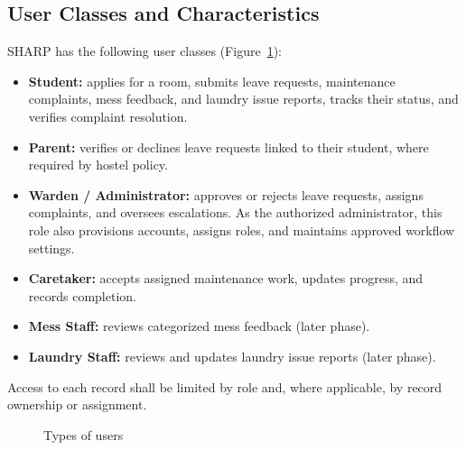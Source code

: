\documentclass[11pt,a4paper]{article}
\numberwithin{figure}{section}   %
\begin{document}
\subsection{User Classes and Characteristics}\label{sec:users}
SHARP has the following user classes (Figure~\ref{fig:users}):
\begin{itemize}
\item \textbf{Student:} applies for a room, submits leave requests, maintenance complaints, mess feedback, and laundry issue reports, tracks their status, and verifies complaint resolution.
\item \textbf{Parent:} verifies or declines leave requests linked to their student, where required by hostel policy.
\item \textbf{Warden / Administrator:} approves or rejects leave requests, assigns complaints, and oversees escalations. As the authorized administrator, this role also provisions accounts, assigns roles, and maintains approved workflow settings.
\item \textbf{Caretaker:} accepts assigned maintenance work, updates progress, and records completion.
\item \textbf{Mess Staff:} reviews categorized mess feedback (later phase).
\item \textbf{Laundry Staff:} reviews and updates laundry issue reports (later phase).
\end{itemize}
Access to each record shall be limited by role and, where applicable, by record ownership or assignment.

\begin{figure}[H]
\centering
{}
\caption{Types of users}
\label{fig:users}
\end{figure}
\end{document}
